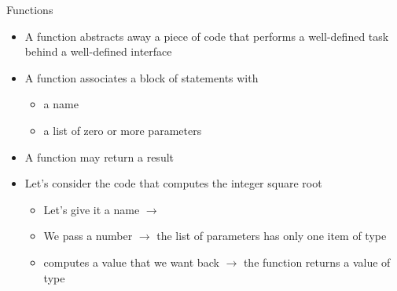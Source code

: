 \begin{frame}{Functions}

  \begin{itemize}[<+->]
  \item A function abstracts away a piece of code that performs a well-defined
    task behind a well-defined interface
  \item A function associates a block of statements with
    \begin{itemize}
    \item a name
    \item a list of zero or more parameters
    \end{itemize}
  \item A function may return a result
  \end{itemize}

  \begin{itemize}[<+->]
  \item Let's consider the code that computes the integer square root
    \begin{itemize}
    \item Let's give it a name $\rightarrow$ 
    \item We pass  a number $\rightarrow$ the list of parameters has
      only one item of type 
    \item {} computes a value that we want back $\rightarrow$ the
      function returns a value of type 
    \end{itemize}
  \end{itemize}

\end{frame}

